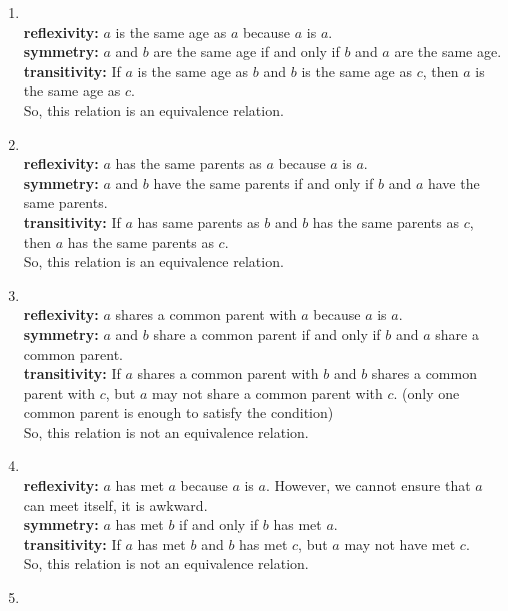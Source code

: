 \begin{enumerate}
    \item {}\\
    \textbf{reflexivity: } $a$ is the same age as $a$ because $a$ is $a$.\\
    \textbf{symmetry: } $a$ and $b$ are the same age if and only if $b$ and $a$ are the same age.\\
    \textbf{transitivity: } If $a$ is the same age as $b$ and $b$ is the same age as $c$, then $a$ is the same age as $c$.\\
    So, this relation is an equivalence relation.
    \item {} \\
    \textbf{reflexivity: } $a$ has the same parents as $a$ because $a$ is $a$.\\
    \textbf{symmetry: } $a$ and $b$ have the same parents if and only if $b$ and $a$ have the same parents.\\
    \textbf{transitivity: } If $a$ has same parents as $b$ and $b$ has the same parents as $c$, then $a$ has the same parents as $c$.\\
    So, this relation is an equivalence relation.
    \item {} \\
    \textbf{reflexivity: } $a$ shares a common parent with $a$ because $a$ is $a$.\\
    \textbf{symmetry: } $a$ and $b$ share a common parent if and only if $b$ and $a$ share a common parent.\\
    \textbf{transitivity: } If $a$ shares a common parent with $b$ and $b$ shares a common parent with $c$, but $a$ may not share a common parent with $c$. (only one common parent is enough to satisfy the condition) \\
    So, this relation is not an equivalence relation.
    \item {} \\
    \textbf{reflexivity: } $a$ has met $a$ because $a$ is $a$. However, we cannot ensure that $a$ can meet itself, it is awkward.\\
    \textbf{symmetry: } $a$ has met $b$ if and only if $b$ has met $a$.\\
    \textbf{transitivity: } If $a$ has met $b$ and $b$ has met $c$, but $a$ may not have met $c$.\\
    So, this relation is not an equivalence relation.
    \item {} \\

\end{enumerate}
